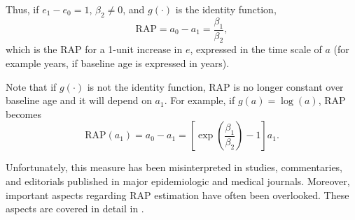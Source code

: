 Thus, if $e_1-e_0=1$, $\beta_2 \neq 0$, and $g(\cdot)$ is the identity function,
\begin{equation}
\mathrm{RAP} = a_0 - a_1 = \frac{\beta_1}{\beta_2},
\label{eq:para_rap}
\end{equation}
which is the RAP for a 1-unit increase in $e$, expressed in the time scale of $a$ (for example years, if baseline age is expressed in years).

Note that if $g(\cdot)$ is not the identity function, RAP is no longer constant over baseline age and it will depend on $a_1$. For example, if $g(a) = \log(a)$, RAP becomes
\begin{equation}
\mathrm{RAP}(a_1) = a_0 - a_1 = \left[ \exp \left( \frac{\beta_1}{\beta_2} \right) - 1 \right] a_1.
\label{eq:para_log_rap}
\end{equation}

Unfortunately, this measure has been misinterpreted in  studies, commentaries, and editorials published in major epidemiologic and medical journals. Moreover, important aspects regarding RAP estimation have often been overlooked. These aspects are covered in detail in .


